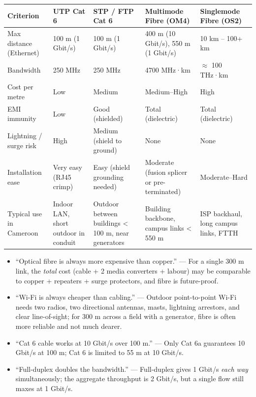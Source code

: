\documentclass[11pt]{article}
\begin{document}
\begin{center}
\begin{tabularx}{\linewidth}{|l|X|X|X|X|}
\hline
\rowcolor{popblueL} \textbf{Criterion} & \textbf{UTP Cat 6} & \textbf{STP / FTP Cat 6} & \textbf{Multimode Fibre (OM4)} & \textbf{Singlemode Fibre (OS2)} \\
\hline
Max distance (Ethernet) & 100 m (1 Gbit/s) & 100 m (1 Gbit/s) & 400 m (10 Gbit/s), 550 m (1 Gbit/s) & 10 km – 100+ km \\
Bandwidth & 250 MHz & 250 MHz & 4700 MHz·km & $\approx$ 100 THz·km \\
Cost per metre & Low & Medium & Medium–High & High \\
EMI immunity & Low & Good (shielded) & Total (dielectric) & Total (dielectric) \\
Lightning / surge risk & High & Medium (shield to ground) & None & None \\
Installation ease & Very easy (RJ45 crimp) & Easy (shield grounding needed) & Moderate (fusion splicer or pre-terminated) & Moderate–Hard \\
Typical use in Cameroon & Indoor LAN, short outdoor in conduit & Outdoor between buildings < 100 m, near generators & Building backbone, campus links < 550 m & ISP backhaul, long campus links, FTTH \\
\hline
\end{tabularx}
\end{center}

\begin{attention}
\begin{itemize}
\item ``Optical fibre is always more expensive than copper.'' — For a single 300 m link, the \emph{total} cost (cable + 2 media converters + labour) may be comparable to copper + repeaters + surge protectors, and fibre is future-proof.
\item ``Wi-Fi is always cheaper than cabling.'' — Outdoor point-to-point Wi-Fi needs two radios, two directional antennas, masts, lightning arrestors, and clear line-of-sight; for 300 m across a field with a generator, fibre is often more reliable and not much dearer.
\item ``Cat 6 cable works at 10 Gbit/s over 100 m.'' — Only Cat 6a guarantees 10 Gbit/s at 100 m; Cat 6 is limited to 55 m at 10 Gbit/s.
\item ``Full-duplex doubles the bandwidth.'' — Full-duplex gives 1 Gbit/s \emph{each way} simultaneously; the aggregate throughput is 2 Gbit/s, but a single flow still maxes at 1 Gbit/s.
\end{itemize}
\end{attention}
\end{document}
